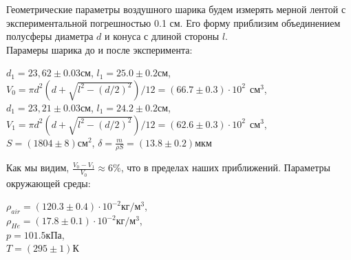 \begin{table}[h!]
\begin{minipage}{0.7\textwidth}
Геометрические параметры воздушного шарика будем измерять мерной лентой с экспериментальной погрешностью 0.1 см. Его форму приблизим объединением полусферы диаметра $d$ и конуса с длиной стороны $l$.\\

Парамеры шарика до и после эксперимента:
\begin{enumerate}
	$d_1 = 23,62 \pm 0.03см$, $l_1 = 25.0 \pm 0.2см$,\\
	$V_0 = \pi d^2(d + \sqrt{l^2 - (d/2)^2}) / 12 = (66.7 \pm 0.3) \cdot 10 ^ {2} \:\:см^3$,\\
	$d_1 = 23,21 \pm 0.03см$, $l_1 = 24.2 \pm 0.2см$,\\
	$V_1 = \pi d^2(d + \sqrt{l^2 - (d/2)^2}) / 12 = (62.6 \pm 0.3) \cdot 10 ^ {2} \:\:см^3$,\\
	$S = (1804 \pm 8) см^2$, $\delta = \frac{m}{\rho S} = (13.8 \pm 0.2)мкм$
\end{enumerate}
Как мы видим, $\frac{V_0 - V_1}{V_0} \approx 6\%$, что в пределах наших приближений. Параметры окружающей среды:
\begin{enumerate}
	$\rho_{air} = (120.3 \pm 0.4) \cdot 10^{-2}кг/м^3$,\\
	$\rho_{He} = (17.8 \pm 0.1) \cdot 10^{-2}кг/м^3$,\\
	$p = 101.5 кПа$,\\
	$T = (295 \pm 1) К$

\end{enumerate}

\end{minipage}
\end{table}


